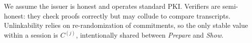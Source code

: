 We assume the issuer is honest and operates standard PKI. Verifiers are semi-honest: they check proofs correctly but may collude to compare transcripts. 
Unlinkability relies on re-randomization of commitments, so the only stable value within a session is $C^{(j)}$, intentionally shared between \emph{Prepare} and \emph{Show}.
